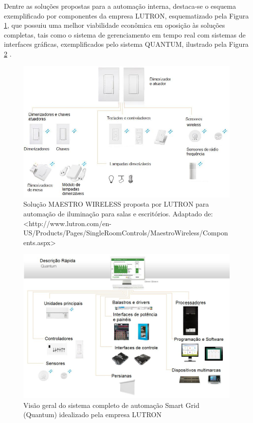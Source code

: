 Dentre as soluções propostas para a automação interna, destaca-se o esquema exemplificado por componentes da empresa LUTRON, esquematizado pela Figura \ref{fig:maestrowireless}, que possuiu uma melhor viabilidade econômica em oposição às soluções completas, tais como o sistema de gerenciamento em tempo real com sistemas de interfaces gráficas, exemplificados pelo sistema QUANTUM, ilustrado pela Figura \ref{fig:sistemaquantum} \cite{2}. 
\begin{figure}[!h]
	\centering
	\includegraphics[width=1.0\textwidth]{figuras/maestroWireless.jpeg}
	\caption{Solução MAESTRO WIRELESS proposta por LUTRON para automação de iluminação para salas e  escritórios. Adaptado de: <http://www.lutron.com/en-US/Products/Pages/SingleRoomControls/MaestroWireless/Components.aspx>}
	\label{fig:maestrowireless}
\end{figure}

\begin{figure}[!h]
	\centering
	\includegraphics[width=1.0\textwidth]{figuras/sistemaQuantum.jpeg}
	\caption{Visão geral do sistema completo de automação Smart Grid (Quantum) idealizado pela empresa LUTRON}
	\label{fig:sistemaquantum}
\end{figure}

